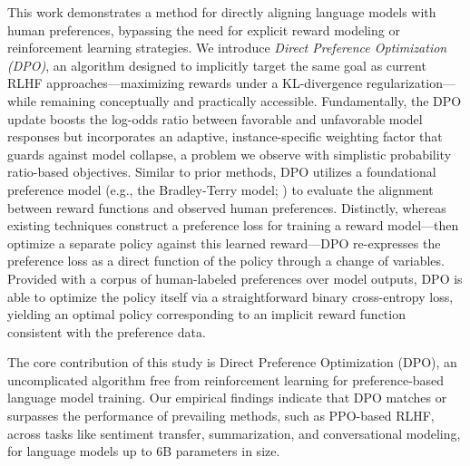 This work demonstrates a method for directly aligning language models with human preferences, bypassing the need for explicit reward modeling or reinforcement learning strategies. We introduce \textit{{Direct Preference Optimization} (DPO)}, an algorithm designed to implicitly target the same goal as current RLHF approaches—maximizing rewards under a KL-divergence regularization—while remaining conceptually and practically accessible. Fundamentally, the DPO update boosts the log-odds ratio between favorable and unfavorable model responses but incorporates an adaptive, instance-specific weighting factor that guards against model collapse, a problem we observe with simplistic probability ratio-based objectives. Similar to prior methods, DPO utilizes a foundational preference model (e.g., the Bradley-Terry model; \cite{bradley1952rankanalysis}) to evaluate the alignment between reward functions and observed human preferences. Distinctly, whereas existing techniques construct a preference loss for training a reward model—then optimize a separate policy against this learned reward—DPO re-expresses the preference loss as a direct function of the policy through a change of variables. Provided with a corpus of human-labeled preferences over model outputs, DPO is able to optimize the policy itself via a straightforward binary cross-entropy loss, yielding an optimal policy corresponding to an implicit reward function consistent with the preference data.

The core contribution of this study is Direct Preference Optimization (DPO), an uncomplicated algorithm free from reinforcement learning for preference-based language model training. Our empirical findings indicate that DPO matches or surpasses the performance of prevailing methods, such as PPO-based RLHF, across tasks like sentiment transfer, summarization, and conversational modeling, for language models up to 6B parameters in size.

